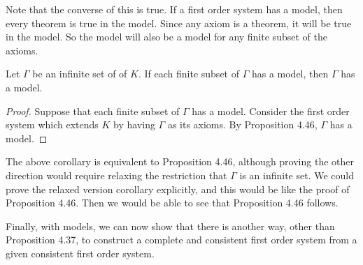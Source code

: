 Note that the converse of this is true. If a first order system has a model, then every theorem is true in the model. Since any axiom is a theorem, it will be true in the model. So the model will also be a model for any finite subset of the axioms.

\begin{corollary}
  Let \(\Gamma\) be an infinite set of \wfs{} of \(K\). If each finite subset of \(\Gamma\) has a model, then \(\Gamma\) has a model.

  \begin{proof}
    Suppose that each finite subset of \(\Gamma\) has a model. Consider the first order system which extends \(K\) by having \(\Gamma\) as its axioms. By Proposition 4.46, \(\Gamma\) has a model.
  \end{proof}
\end{corollary}

The above corollary is equivalent to Proposition 4.46, although proving the other direction would require relaxing the restriction that \(\Gamma\) is an infinite set. We could prove the relaxed version corollary explicitly, and this would be like the proof of Proposition 4.46. Then we would be able to see that Proposition 4.46 follows.

Finally, with models, we can now show that there is another way, other than Proposition 4.37, to construct a complete and consistent first order system from a given consistent first order system.

